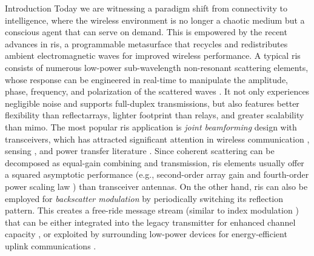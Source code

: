 \documentclass[journal]{IEEEtran}
\begin{document}
\begin{section}{Introduction}
	Today we are witnessing a paradigm shift from connectivity to intelligence, where the wireless environment is no longer a chaotic medium but a conscious agent that can serve on demand.
	This is empowered by the recent advances in \gls{ris}, a programmable metasurface that recycles and redistributes ambient electromagnetic waves for improved wireless performance.
	A typical \gls{ris} consists of numerous low-power sub-wavelength non-resonant scattering elements, whose response can be engineered in real-time to manipulate the amplitude, phase, frequency, and polarization of the scattered waves \cite{Basar2019}.
	It not only experiences negligible noise and supports full-duplex transmissions, but also features better flexibility than reflectarrays, lighter footprint than relays, and greater scalability than \gls{mimo}.
	The most popular \gls{ris} application is \emph{joint beamforming} design with transceivers, which has attracted significant attention in wireless communication \cite{Wu2019,Guo2020,Liu2022}, sensing \cite{He2022,Luo2022,Hua2023}, and power transfer literature \cite{Wu2020a,Feng2022,Zhao2022}.
	Since coherent scattering can be decomposed as equal-gain combining and transmission, \gls{ris} elements usually offer a squared asymptotic performance (e.g., second-order array gain and fourth-order power scaling law \cite{Zhao2022}) than transceiver antennas.
	On the other hand, \gls{ris} can also be employed for \emph{backscatter modulation} by periodically switching its reflection pattern.
	This creates a free-ride message stream (similar to index modulation \cite{Basar2017}) that can be either integrated into the legacy transmitter for enhanced channel capacity \cite{Karasik2020,Basar2020,Ye2022}, or exploited by surrounding low-power devices for energy-efficient uplink communications \cite{Liang2020,Zhao2022a,Yang2024}.


\end{section}
\end{document}
